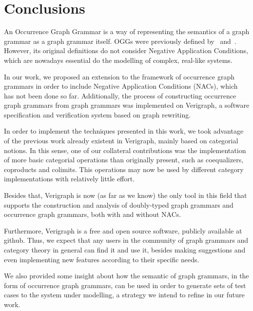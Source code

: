 \chapter{Conclusions}\label{ch:conclusions}

An Occurrence Graph Grammar is a way of representing the semantics of a graph grammar as a graph grammar itself. OGGs were previously defined by~\cite{Ribeiro1996} and~\cite{Corradini1996}. However, its original definitions do not consider Negative Application Conditions, which are nowadays essential do the modelling of complex, real-like systems.

  In our work, we proposed an extension to the framework of occurrence graph grammars in order to include Negative Application Conditions (NACs), which has not been done so far. Additionally, the process of constructing occurrence graph grammars from graph grammars was implemented on Verigraph, a software specification and verification system based on graph rewriting.%


In order to implement the techniques presented in this work, we took advantage of the previous work already existent in Verigraph, mainly based on categorial notions. In this sense, one of our collateral contributions was the implementation of more basic categorial operations than originally present, such as coequalizers, coproducts and colimits. This operations may now be used by different category implementations with relatively little effort. 

Besides that, Verigraph is now (as far as we know) the only tool in this field that supports the construction and analysis of doubly-typed graph grammars and occurrence graph grammars, both with and without NACs.

    Furthermore, Verigraph is a free and open source software, publicly available at github. Thus, we expect that any users in the community of graph grammars and category theory in general can find it and use it, besides making suggestions and even implementing new features according to their specific needs.

We also provided some insight about how the semantic of graph grammars, in the form of occurrence graph grammars, can be used in order to generate sets of test cases to the system under modelling, a strategy we intend to refine in our future work.

